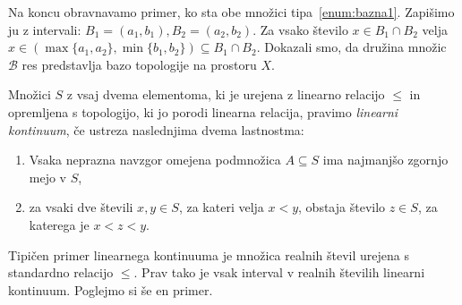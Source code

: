 \documentclass[../TG_magistrsko_delo_sections.tex]{subfiles}
\begin{document}
Na koncu obravnavamo primer, ko sta obe množici tipa~\ref{enum:bazna1}. Zapišimo ju z intervali: $B_1 = (a_1, b_1), B_2 =(a_2, b_2)$. Za vsako število $x \in B_1 \cap B_2$ velja $x \in (\max\{a_1, a_2\}, \min\{b_1, b_2\}) \subseteq B_1 \cap B_2$. Dokazali smo, da družina množic $\mathcal{B}$ res predstavlja bazo topologije na prostoru $X$.

\begin{definicija}
Množici $S$ z vsaj dvema elementoma, ki je urejena z linearno relacijo $\leq$ in opremljena s topologijo, ki jo porodi linearna relacija, pravimo \emph{linearni kontinuum}, če ustreza naslednjima dvema lastnostma:
\begin{enumerate}
\item Vsaka neprazna navzgor omejena podmnožica $A \subseteq S$ ima najmanjšo zgornjo mejo v $S$,\label{enum:L1}
\item za vsaki dve števili $x, y \in S$, za kateri velja $x<y$, obstaja število $z \in S$, za katerega je $x<z<y$.\label{enum:L2}
\end{enumerate}
\end{definicija}

Tipičen primer linearnega kontinuuma je množica realnih števil urejena s standardno relacijo $\leq$. Prav tako je vsak interval v realnih številih linearni kontinuum. Poglejmo si še en primer. 
\end{document}
